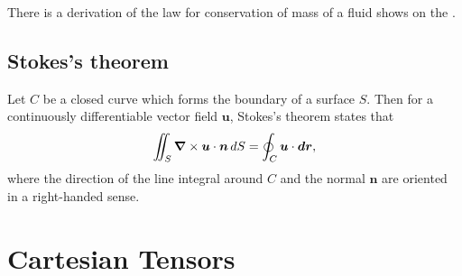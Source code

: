 There is a derivation of the law for conservation of mass of a fluid shows on the \cite[pg. 85]{matthews1998vector}. 

\subsection{Stokes's theorem}
Let $C$ be a closed curve which forms the boundary of a surface $S$. 
Then for a continuously differentiable vector field $\bm{u}$, Stokes's theorem states that
\begin{equation}
    \iint_{S} \bm{\nabla} \times \bm{u} \cdot \bm{n} \, d S
    =\oint_{C} \bm{u} \cdot \bm{dr},
\end{equation}
where the direction of the line integral around $C$ and the normal $\bm{n}$ are oriented in a right-handed sense. 


\section{Cartesian Tensors}
